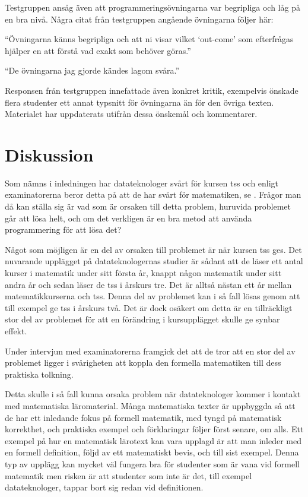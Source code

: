 \documentclass[12pt,a4paper,twoside,openright]{article}
\begin{document}
Testgruppen ansåg även att programmeringsövningarna var begripliga och
låg på en bra nivå. Några citat från testgruppen angående övningarna
följer här:

\begin{displayquote}
  ``Övningarna känns begripliga och att ni visar vilket `out-come'
  som efterfrågas hjälper en att förstå vad exakt som behöver göras.''
\end{displayquote}

\begin{displayquote}
  ``De övningarna jag gjorde kändes lagom svåra.''
\end{displayquote}

Responsen från testgruppen innefattade även konkret kritik, exempelvis
önskade flera studenter ett annat typsnitt för övningarna än för den
övriga texten. Materialet har uppdaterats utifrån dessa önskemål och
kommentarer.

\newpage

\section{Diskussion}
\label{sec:diskussion}

Som nämns i inledningen har datateknologer svårt för kursen
\gls{tss} och enligt examinatorerna beror detta på att de har svårt för
matematiken, se . Frågor man då
kan ställa sig är vad som är orsaken till detta problem, huruvida
problemet går att lösa helt, och om det verkligen är en bra metod att
använda programmering för att lösa det?

Något som möjligen är en del av orsaken till problemet är när kursen
\gls{tss} ges. Det nuvarande upplägget på datateknologernas studier
är sådant att de läser ett antal kurser i matematik under sitt första
år, knappt någon matematik under sitt andra år och sedan läser de
\gls{tss} i årskurs tre. Det är alltså nästan ett år mellan
matematikkurserna och \gls{tss}. Denna del av problemet kan i så
fall lösas genom att till exempel ge \gls{tss} i årskurs två. Det är dock
osäkert om detta är en tillräckligt stor del av problemet för att en
förändring i kursupplägget skulle ge synbar effekt.

Under intervjun med examinatorerna
framgick det att de tror att en stor del av problemet ligger i
svårigheten att koppla den formella matematiken till dess praktiska
tolkning.

Detta skulle i så fall kunna orsaka problem när datateknologer kommer
i kontakt med matematiska läromaterial. Många matematiska texter är
uppbyggda så att de har ett inledande fokus på formell matematik, med
tyngd på matematisk korrekthet, och praktiska exempel och förklaringar
följer först senare, om alls. Ett exempel på hur en matematisk
lärotext kan vara upplagd är att man inleder med en formell
definition, följd av ett matematiskt bevis, och till sist
exempel. Denna typ av upplägg kan mycket väl fungera bra för studenter
som är vana vid formell matematik men risken är att studenter som inte
är det, till exempel datateknologer, tappar bort sig redan vid
definitionen.
\end{document}
